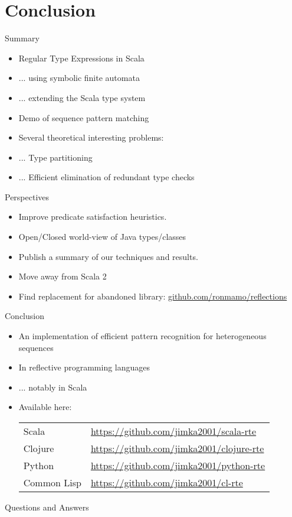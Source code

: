 \section{Conclusion}

{  %
\begin{frame}{Summary}
  \begin{itemize}
  \item Regular Type Expressions in Scala
  \item ... using symbolic finite automata
  \item ... extending the Scala type system
  \item Demo of sequence pattern matching
  \item Several theoretical interesting problems:
  \item ... Type partitioning
  \item ... Efficient elimination of redundant type checks
  \end{itemize}
\end{frame}
}

\begin{frame}{Perspectives}
  \begin{itemize}
  \item Improve predicate satisfaction heuristics.
  \item Open/Closed world-view of Java types/classes
  \item Publish a summary of our techniques and results.
  \item Move away from Scala 2
  \item Find replacement for abandoned library:   \url{github.com/ronmamo/reflections}
  \end{itemize}
\end{frame}

\begin{frame}{Conclusion}
  \begin{itemize}
  \item An implementation of efficient pattern recognition for heterogeneous sequences
  \item In reflective programming languages
  \item ... notably in Scala
  \item Available here:

    \medskip
    
    \begin{tabular}{ll}
    Scala & \url{https://github.com/jimka2001/scala-rte}\\
    Clojure & \url{https://github.com/jimka2001/clojure-rte}\\
    Python & \url{https://github.com/jimka2001/python-rte}\\
    Common Lisp & \url{https://github.com/jimka2001/cl-rte}    
  \end{tabular}
  \end{itemize}
\end{frame}

\begin{frame}{Questions and Answers}
\end{frame}
